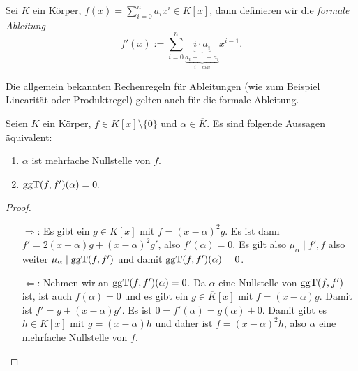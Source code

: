 \begin{definition}
    Sei $K$ ein Körper, $f(x) = \sum_{i=0}^n a_i x^i \in K[x]$, dann definieren wir die \emph{formale Ableitung}
    $$ f'(x) := \sum_{i=0}^n \underbrace{i\cdot a_i}_{\underbrace{a_i + \ldots + a_i}_{i-mal}} x^{i-1}. $$
\end{definition}
\begin{remark}
    Die allgemein bekannten Rechenregeln für Ableitungen (wie zum Beispiel Linearität oder Produktregel) gelten auch für die formale Ableitung.
\end{remark}

\begin{lemma}\label{lemma:mehrfache_nullstellen}
    Seien $K$ ein Körper, $f \in K[x]\setminus\{0\}$ und $\alpha \in \overline{K}$. Es sind folgende Aussagen äquivalent:
    \begin{enumerate}
        \item $\alpha$ ist mehrfache Nullstelle von $f$.
        \item $\operatorname{ggT}(f, f')(\alpha) = 0.$
    \end{enumerate}
\end{lemma}
\begin{proof}{\ }
    \begin{enumerate} 
        \item[$\Rightarrow$:] Es gibt ein $g \in \overline{K}[x]$ mit $f = (x-\alpha)^2 g$. Es ist dann $f' = 2(x-\alpha)g + (x-\alpha)^2g'$, also $f'(\alpha) = 0$. Es gilt also $\mu_\alpha \mid f', f$ also weiter $\mu_\alpha \mid \operatorname{ggT}(f, f')$ und damit $\operatorname{ggT}(f, f')(\alpha) = 0$. 
         
        \item[$\Leftarrow$:] Nehmen wir an $\operatorname{ggT}(f, f')(\alpha) = 0$. Da $\alpha$ eine Nullstelle von $\operatorname{ggT}(f, f')$ ist, ist auch $f(\alpha) = 0$ und es gibt ein $g \in \overline{K}[x]$ mit $f = (x-\alpha)g$. Damit ist $f' = g + (x-\alpha)g'$. Es ist $0 = f'(\alpha) = g(\alpha) + 0$. Damit gibt es $h \in \overline{K}[x]$ mit $g = (x-\alpha)h$ und daher ist $f = (x-\alpha)^2h$, also $\alpha$ eine mehrfache Nullstelle von $f$.
    \end{enumerate}
\end{proof}

